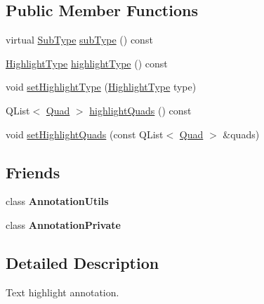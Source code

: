 \subsection*{Public Member Functions}
\begin{DoxyCompactItemize}
\item 
virtual \hyperlink{class_poppler_1_1_annotation_a2d592999c330949d64679cfa9e81113f}{Sub\+Type} \hyperlink{class_poppler_1_1_highlight_annotation_ab71e12c01a8005c2fb4a4db9c218c8da}{sub\+Type} () const
\item 
\hyperlink{class_poppler_1_1_highlight_annotation_ae605e74038eb2a3810a789377524f2a0}{Highlight\+Type} \hyperlink{class_poppler_1_1_highlight_annotation_ae53f82e1935c7d8ca63578bc70956896}{highlight\+Type} () const
\item 
void \hyperlink{class_poppler_1_1_highlight_annotation_a7be625cca117ef75aeb1b1f569d575d7}{set\+Highlight\+Type} (\hyperlink{class_poppler_1_1_highlight_annotation_ae605e74038eb2a3810a789377524f2a0}{Highlight\+Type} type)
\item 
Q\+List$<$ \hyperlink{struct_poppler_1_1_highlight_annotation_1_1_quad}{Quad} $>$ \hyperlink{class_poppler_1_1_highlight_annotation_a9d3811c1d9d60dcb7fcd7bf611d0862e}{highlight\+Quads} () const
\item 
void \hyperlink{class_poppler_1_1_highlight_annotation_a2629917c423793c5eb96ec5eb9a563b0}{set\+Highlight\+Quads} (const Q\+List$<$ \hyperlink{struct_poppler_1_1_highlight_annotation_1_1_quad}{Quad} $>$ \&quads)
\end{DoxyCompactItemize}
\subsection*{Friends}
\begin{DoxyCompactItemize}
\item 
\mbox{\label{class_poppler_1_1_highlight_annotation_a13daac1cbc1823e18498579fc26b344f}} 
class {\bfseries Annotation\+Utils}
\item 
\mbox{\label{class_poppler_1_1_highlight_annotation_add0bc3e32e560f9e9eb3025587c1ad54}} 
class {\bfseries Annotation\+Private}
\end{DoxyCompactItemize}


\subsection{Detailed Description}
Text highlight annotation. 

